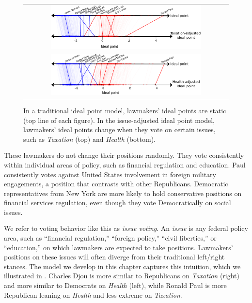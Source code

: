 \begin{figure}
  \center
  \begin{tabular}{c}
  \includegraphics[width=0.75\textwidth]{chapter_inferring_issue_preferences/figures/3393_example_ideal_points_taxation.pdf} \\
  \includegraphics[width=0.75\textwidth]{chapter_inferring_issue_preferences/figures/3393_example_ideal_points_health.pdf} \\
  \end{tabular}
  \caption{In a traditional ideal point model, lawmakers' ideal points
    are static (top line of each figure).  In the issue-adjusted ideal point model, lawmakers'
    ideal points change when they vote on certain issues, such as
    \emph{Taxation} (top) and \emph{Health} (bottom).}
  \label{fig:moving_ideal_points}
\end{figure}

These lawmakers do not change their positions randomly.  They vote
consistently within individual areas of policy, such as financial
regulation and education.  Paul consistently votes against United
States involvement in foreign military engagements, a position that
contrasts with other Republicans.  Democratic representatives from New
York are more likely to hold conservative positions on financial
services regulation, even though they vote Democratically on social
issues.

We refer to voting behavior like this as \emph{issue voting}.  An
\emph{issue} is any federal policy area, such as ``financial
regulation,'' ``foreign policy,'' ``civil liberties,'' or
``education,'' on which lawmakers are expected to take positions.
Lawmakers' positions on these issues will often diverge from their
traditional left/right stances.  The model we develop in this chapter
captures this intuition, which we illustrated in
.  Charles Djou is more similar
to Republicans on \emph{Taxation} (right) and more similar to
Democrats on \emph{Health} (left), while Ronald Paul is more
Republican-leaning on \emph{Health} and less extreme on
\emph{Taxation}.

